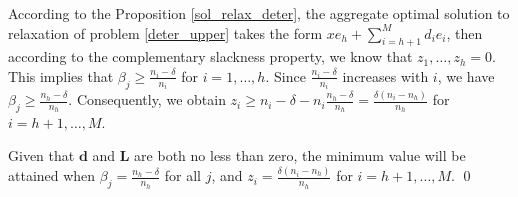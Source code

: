 \begin{pf}
  According to the Proposition \ref{sol_relax_deter}, the aggregate optimal solution to relaxation of problem \eqref{deter_upper} takes the form $x e_{h} + \sum_{i=h+1} ^{M} d_{i} e_{i}$, then according to the complementary slackness property, we know that $z_1, \ldots, z_h = 0$. This implies that $\beta_j \geq \frac{n_i - \delta}{n_i}$ for $i = 1,\ldots, h$. Since $\frac{n_i - \delta}{n_i}$ increases with $i$, we have $\beta_j \geq \frac{n_h - \delta}{n_h}$. Consequently, we obtain $z_{i} \geq n_i - \delta - n_i \frac{n_h - \delta}{n_h} = \frac{\delta(n_i-n_h)}{n_h}$ for $i = h+1, \ldots, M$.
  
  Given that $\mathbf{d}$ and $\mathbf{L}$ are both no less than zero, the minimum value will be attained when $\beta_j = \frac{n_h - \delta}{n_h}$ for all $j$, and $z_i = \frac{\delta(n_i-n_h)}{n_h}$ for $i = h+1, \ldots, M$.  \qed
\end{pf}







\newpage
